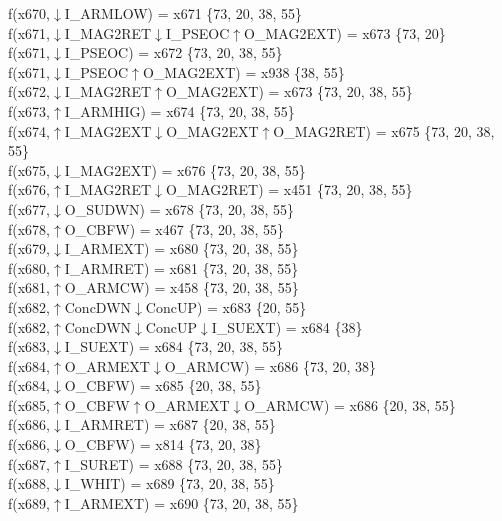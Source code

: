 f(x670,$\downarrow$I\_ARMLOW) = x671 \{73, 20, 38, 55\} \\  
f(x671,$\downarrow$I\_MAG2RET$\downarrow$I\_PSEOC$\uparrow$O\_MAG2EXT) = x673 \{73, 20\} \\  
f(x671,$\downarrow$I\_PSEOC) = x672 \{73, 20, 38, 55\} \\  
f(x671,$\downarrow$I\_PSEOC$\uparrow$O\_MAG2EXT) = x938 \{38, 55\} \\  
f(x672,$\downarrow$I\_MAG2RET$\uparrow$O\_MAG2EXT) = x673 \{73, 20, 38, 55\} \\  
f(x673,$\uparrow$I\_ARMHIG) = x674 \{73, 20, 38, 55\} \\  
f(x674,$\uparrow$I\_MAG2EXT$\downarrow$O\_MAG2EXT$\uparrow$O\_MAG2RET) = x675 \{73, 20, 38, 55\} \\  
f(x675,$\downarrow$I\_MAG2EXT) = x676 \{73, 20, 38, 55\} \\  
f(x676,$\uparrow$I\_MAG2RET$\downarrow$O\_MAG2RET) = x451 \{73, 20, 38, 55\} \\  
f(x677,$\downarrow$O\_SUDWN) = x678 \{73, 20, 38, 55\} \\  
f(x678,$\uparrow$O\_CBFW) = x467 \{73, 20, 38, 55\} \\  
f(x679,$\downarrow$I\_ARMEXT) = x680 \{73, 20, 38, 55\} \\  
f(x680,$\uparrow$I\_ARMRET) = x681 \{73, 20, 38, 55\} \\  
f(x681,$\uparrow$O\_ARMCW) = x458 \{73, 20, 38, 55\} \\  
f(x682,$\uparrow$ConcDWN$\downarrow$ConcUP) = x683 \{20, 55\} \\  
f(x682,$\uparrow$ConcDWN$\downarrow$ConcUP$\downarrow$I\_SUEXT) = x684 \{38\} \\  
f(x683,$\downarrow$I\_SUEXT) = x684 \{73, 20, 38, 55\} \\  
f(x684,$\uparrow$O\_ARMEXT$\downarrow$O\_ARMCW) = x686 \{73, 20, 38\} \\  
f(x684,$\downarrow$O\_CBFW) = x685 \{20, 38, 55\} \\  
f(x685,$\uparrow$O\_CBFW$\uparrow$O\_ARMEXT$\downarrow$O\_ARMCW) = x686 \{20, 38, 55\} \\  
f(x686,$\downarrow$I\_ARMRET) = x687 \{20, 38, 55\} \\  
f(x686,$\downarrow$O\_CBFW) = x814 \{73, 20, 38\} \\  
f(x687,$\uparrow$I\_SURET) = x688 \{73, 20, 38, 55\} \\  
f(x688,$\downarrow$I\_WHIT) = x689 \{73, 20, 38, 55\} \\  
f(x689,$\uparrow$I\_ARMEXT) = x690 \{73, 20, 38, 55\} \\  
